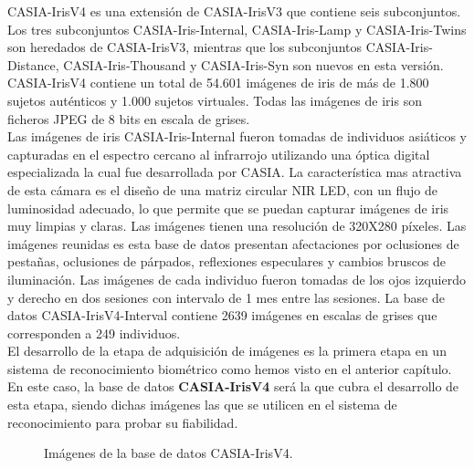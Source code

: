 CASIA-IrisV4 es una extensión de CASIA-IrisV3 que contiene seis subconjuntos. Los tres subconjuntos CASIA-Iris-Internal, CASIA-Iris-Lamp y CASIA-Iris-Twins son heredados de CASIA-IrisV3, mientras que los subconjuntos CASIA-Iris-Distance, CASIA-Iris-Thousand y CASIA-Iris-Syn son nuevos en esta versión. \\

CASIA-IrisV4 contiene un total de 54.601 imágenes de iris de más de 1.800 sujetos auténticos y 1.000 sujetos virtuales. Todas las imágenes de iris son ficheros JPEG de 8 bits en escala de grises. \\

Las imágenes de iris CASIA-Iris-Internal fueron tomadas de individuos asiáticos y capturadas en el espectro cercano al infrarrojo utilizando una óptica digital especializada la cual fue desarrollada por CASIA. La característica mas atractiva de esta cámara es el diseño de una matriz circular NIR LED, con un flujo de luminosidad adecuado, lo que permite que se puedan capturar imágenes de iris muy limpias y claras. Las imágenes tienen una resolución de 320X280 píxeles. Las imágenes reunidas es esta base de datos presentan afectaciones por oclusiones de pestañas, oclusiones de párpados, reflexiones especulares y cambios bruscos de iluminación. Las imágenes de cada individuo fueron tomadas de los ojos izquierdo y derecho en dos sesiones con intervalo de 1 mes entre las sesiones. La base de datos CASIA-IrisV4-Interval contiene 2639 imágenes en escalas de grises que corresponden a 249 individuos. \\

El desarrollo de la etapa de adquisición de imágenes es la primera etapa en un sistema de reconocimiento biométrico como hemos visto en el anterior capítulo. En este caso, la base de datos \textbf{CASIA-IrisV4} será la que cubra el desarrollo de esta etapa, siendo dichas imágenes las que se utilicen en el sistema de reconocimiento para probar su fiabilidad. \\

\begin{figure}[htbp]
\centering
{}
\caption{Imágenes de la base de datos CASIA-IrisV4.} \label{fig:señales}
\end{figure}


